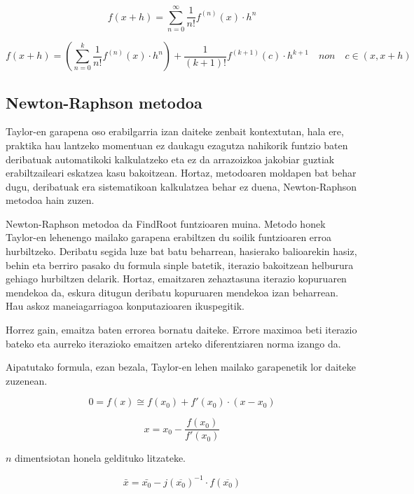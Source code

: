 \documentclass[10pt,a4paper,basque]{article}
\begin{document}
$$f(x + h) = \sum_{n = 0}^{\infty} \frac{1}{n!} f^{(n)}(x) \cdot h^n$$

$$f(x + h) = (\sum_{n = 0}^{k} \frac{1}{n!} f^{(n)}(x) \cdot h^n) + \frac{1}{(k+1)!} f^{(k+1)}(c) \cdot h^{k+1} \quad non \quad c \in (x, x+h)$$

\subsection{Newton-Raphson metodoa}

Taylor-en garapena oso erabilgarria izan daiteke zenbait kontextutan, hala ere, praktika hau lantzeko momentuan ez daukagu ezagutza nahikorik funtzio baten deribatuak automatikoki kalkulatzeko eta ez da arrazoizkoa jakobiar guztiak erabiltzaileari eskatzea kasu bakoitzean. Hortaz, metodoaren moldapen bat behar dugu, deribatuak era sistematikoan kalkulatzea behar ez duena, Newton-Raphson metodoa hain zuzen.

Newton-Raphson metodoa da FindRoot funtzioaren muina. Metodo honek Taylor-en lehenengo mailako garapena erabiltzen du soilik funtzioaren erroa hurbiltzeko. Deribatu segida luze bat batu beharrean, hasierako balioarekin hasiz, behin eta berriro pasako du formula sinple batetik, iterazio bakoitzean helburura gehiago hurbiltzen delarik. Hortaz, emaitzaren zehaztasuna iterazio kopuruaren mendekoa da, eskura ditugun deribatu kopuruaren mendekoa izan beharrean. Hau askoz maneiagarriagoa konputazioaren ikuspegitik.

Horrez gain, emaitza baten errorea bornatu daiteke. Errore maximoa beti iterazio bateko eta aurreko iterazioko emaitzen arteko diferentziaren norma izango da.

Aipatutako formula, ezan bezala, Taylor-en lehen mailako garapenetik lor daiteke zuzenean.

$$0 = f(x) \cong f(x_0) + f'(x_0) \cdot (x - x_0)$$

$$x = x_0 - \frac{f(x_0)}{f'(x_0)}$$

$n$ dimentsiotan honela geldituko litzateke.

$$\bar{x} = \bar{x_0} - j(\overline{x_0})^{-1} \cdot f(\overline{x_0})$$
\end{document}
